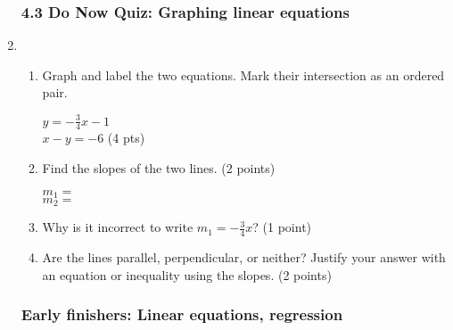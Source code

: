 \documentclass[12pt, twoside]{article}
\begin{document}
\begin{enumerate}
    \subsubsection*{4.3 Do Now Quiz: Graphing linear equations}
    
    \item \begin{enumerate}
        \item Graph and label the two equations. Mark their intersection as an ordered pair.
          \begin{multicols}{2}
            $y =-\frac{3}{4}x-1$ \\
            $x-y=-6$ \hfill (4 pts)
          \end{multicols}     \vspace{1cm}
        \item Find the slopes of the two lines. \hfill (2 points)
          \begin{multicols}{2}
            $m_1=$ \\
            $m_2=$
          \end{multicols}
        \item Why is it incorrect to write $m_1=-\frac{3}{4}x$? \hfill (1 point) \vspace{2cm}
        \item Are the lines parallel, perpendicular, or neither? Justify your answer with an equation or inequality using the slopes. \hfill (2 points)
        \vspace{2cm}
      \end{enumerate}
        \begin{center}
        \end{center}
    
\newpage
\subsubsection*{Early finishers: Linear equations, regression}


\end{enumerate}
\end{document}
